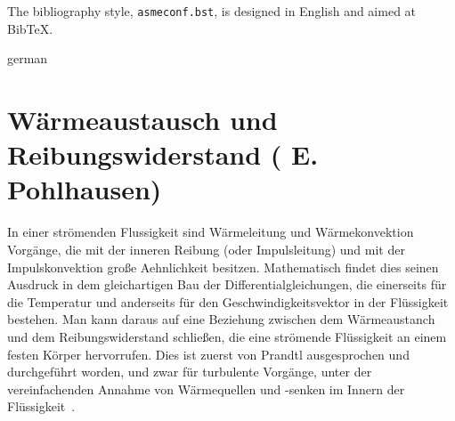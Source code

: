 \documentclass[captionpatch,colorlinks,upint,subscriptcorrection,varvw,german]{asmeconf}
\begin{document}
The bibliography style, \texttt{asmeconf.bst}, is designed in English and aimed at Bib\TeX{}.  


\begin{selectlanguage}{german}%
\section{Wärmeaustausch und Reibungswiderstand ( E. Pohlhausen)}\label{app:pohlhausen}
In einer strömenden Flussigkeit sind Wärmeleitung und Wärmekonvektion Vorgänge, die mit der inneren Reibung (oder Impulsleitung) und mit der Impulskonvektion große Aehnlichkeit besitzen. Mathematisch findet dies seinen Ausdruck in dem gleichartigen Bau der Differentialgleichungen, die einerseits für die Temperatur und anderseits für den Geschwindigkeitsvektor in der Flüssigkeit bestehen. Man kann daraus auf eine Beziehung
zwischen dem Wärmeaustanch und dem Reibungswiderstand schließen, die eine strömende Flüssigkeit an einem festen Körper hervorrufen. Dies ist zuerst von Prandtl ausgesprochen und durchgeführt worden, und zwar für turbulente Vorgänge, unter der vereinfachenden Annahme von Wärmequellen und -senken im Innern der Flüssigkeit~\cite{pohlhausen1921}. 
\end{selectlanguage}%

\end{document}
